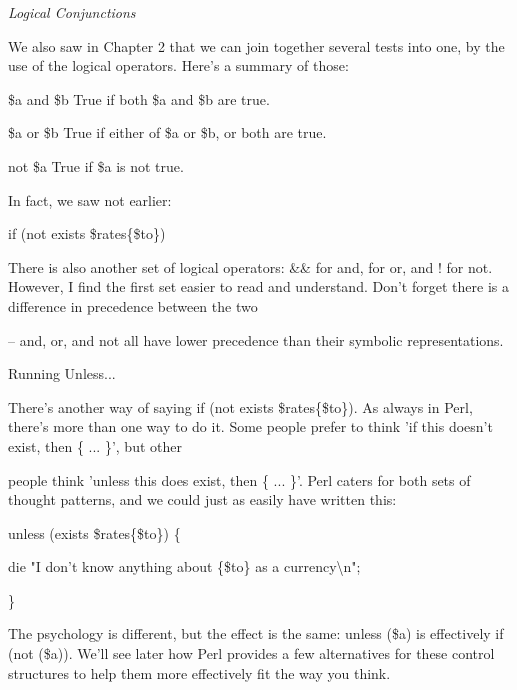 \documentclass[a4paper,11pt]{book}
\begin{document}
\noindent 

\noindent \textit{Logical Conjunctions}

\noindent We also saw in Chapter 2 that we can join together several tests into one, by the use of the logical operators. Here's a summary of those:

\noindent 

\noindent \$a and \$b True if both \$a and \$b are true.

\noindent 

\noindent \$a or \$b True if either of \$a or \$b, or both are true.

\noindent 

\noindent not \$a True if \$a is not true.

\noindent 

\noindent 

\noindent In fact, we saw not earlier:

\noindent 

\noindent if (not exists \$rates\{\$to\})

\noindent 

\noindent There is also another set of logical operators: \&\& for and, \textbar \textbar  for or, and ! for not. However, I find the first set easier to read and understand. Don't forget there is a difference in precedence between the two

\noindent -- and,   or, and not all have lower precedence than their symbolic representations.

\noindent 

\noindent Running Unless...

\noindent 

\noindent There's another way of saying if (not exists \$rates\{\$to\}). As always in Perl, there's more than one way to do it. Some people prefer to think 'if this doesn't exist, then \{ ... \}', but other

\noindent people think 'unless this does exist, then \{ ... \}'. Perl caters for both sets of thought patterns, and we could just as easily have written this:

\noindent 

\noindent unless (exists \$rates\{\$to\}) \{

\noindent die "I don't know anything about \{\$to\} as a currency\textbackslash n";

\noindent \}

\noindent 

\noindent The psychology is different, but the effect is the same: unless (\$a) is effectively if (not (\$a)). We'll see later how Perl provides a few alternatives for these control structures to help them more effectively fit the way you think.
\end{document}

